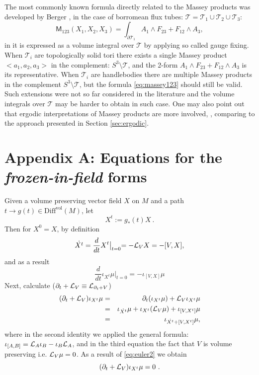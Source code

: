 \documentclass[12pt]{article}
\newcommand{\Lie}{{\cal L}}
\newcommand{\no}{\noindent}
\begin{document}
\no The most commonly known formula directly related to the Massey products was developed by Berger \cite{Berger90}, in the case of 
borromean flux tubes: $\mathcal{T}=\mathcal{T}_1\cup \mathcal{T}_2\cup \mathcal{T}_3$:
\begin{equation}\label{eq:massey123}
 \mathsf{M}_{123}(X_1,X_2,X_3)=\int_{\partial \mathcal{T}_1} A_1\wedge F_{23}+F_{12}\wedge A_3,
\end{equation}
in \cite{Berger90} it is expressed as a volume integral over $\mathcal{T}$ by applying so called gauge fixing. When $\mathcal{T}_i$ are topologically solid tori there exists a single Massey product $<a_1,a_2,a_3>$ in the complement: $S^3\setminus \mathcal{T}$, and the 2-form $A_1\wedge F_{23}+F_{12}\wedge A_3$ is its representative. When $\mathcal{T}_i$ are handlebodies there are multiple Massey products  in the complement $S^3\setminus \mathcal{T}$, but the formula 
\eqref{eq:massey123} should still be valid. Such extensions were not so far considered in the literature and the volume integrals over $\mathcal{T}$ may be harder to obtain in such case.
One may also point out that ergodic interpretations 
of Massey products are more involved, \cite{Laurence-Stredulinsky00b}, comparing to the approach presented in Section \ref{sec:ergodic}. 



\section*{Appendix A: Equations for the \emph{frozen-in-field} forms}
Given a volume preserving vector field $X$ on $M$ and a path $t\longrightarrow g(t)\in \text{Diff}^\text{vol}(M)$, let 
\[
 X^t:=g_\ast(t)X\ . 
\]
Then for $X^0=X$, by definition 
\begin{equation}\label{eq:euler2}
 \dot{X^t}=\frac{d}{dt} X^t\bigl|_{t=0}=-\Lie_V X=-[V,X],
\end{equation}
and as a result 
\[
  \frac{d}{dt} \iota_{X^t}\mu|_{t=0}  =  -\iota_{[V,X]} \mu  
\]
Next, calculate ($\partial_t+\Lie_V\equiv \Lie_{\partial_t+V}$)
\begin{eqnarray*}
 (\partial_t+\Lie_V)\iota_{X^t}\mu & = & \partial_t(\iota_{X^t}\mu)+\Lie_V\iota_{X^t}\mu\\
 & = & \iota_{\dot{X^t}}\mu+\iota_{X^t}(\Lie_V\mu)+\iota_{[V,X^t]}\mu\\
 & = & \iota_{\dot{X^t}+[V,X^t]}\mu,
\end{eqnarray*}
where in the second identity we applied the general formula: $\iota_{[A,B]}=\Lie_A\iota_B-\iota_B\Lie_A$, and in the third equation the fact that $V$ is volume preserving i.e. $\Lie_V\mu=0$. As a result 
of \eqref{eq:euler2} we obtain
\[
 (\partial_t+\Lie_V)\iota_{X^t}\mu=0\ .
\]
\end{document}
